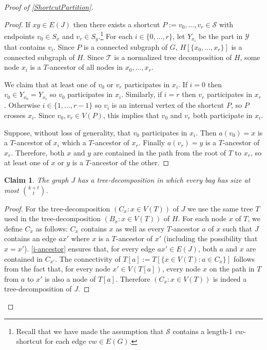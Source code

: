 \documentclass{patmorin}
\theoremstyle{plain}
\newtheorem{clm}{Claim}
\theoremstyle{definition}
\renewcommand{\SS}{\mathcal{S}}
\begin{document}
\begin{proof}[Proof of \cref{ShortcutPartition}]
\begin{proof}
  If $xy\in E(J)$ then there exists a shortcut $P:=v_0,\ldots,v_r\in\SS$ with endpoints $v_0\in S_x$ and $v_r\in S_y$.\footnote{Recall that we have made the assumption that $\SS$ contains a length-$1$ $vw$-shortcut for each edge $vw\in E(G)$.}  For each $i\in\{0,\ldots,r\}$, let $Y_{x_i}$ be the part in $\mathcal{Y}$ that contains $v_i$.  Since $P$ is a connected subgraph of $G$, $H[\{x_0,\ldots,x_r\}]$ is a connected subgraph of $H$.  Since $\mathcal{T}$ is a normalized tree decomposition of $H$, some node $x_i$ is a $T$-ancestor of all nodes in $x_0,\ldots,x_r$.

  We claim that at least one of $v_0$ or $v_r$ participates in $x_i$.  If $i=0$ then $v_0\in Y_{x_0}=Y_{x_i}$ so $v_0$ participates in $x_i$. Similarly, if $i=r$ then $v_r$ participates in $x_r$.  Otherwise $i\in\{1,\ldots,r-1\}$ so $v_i$ is an internal vertex of the shortcut $P$, so $P$ crosses $x_i$.  Since $v_0,v_r\in V(P)$, this implies that $v_0$ and $v_r$ both participate in $x_i$.

  Suppose, without loss of generality, that $v_0$ participates in $x_i$.  Then $a(v_0)=x$ is a $T$-ancestor of $x_i$ which a $T$-ancestor of $x_r$.  Finally $a(v_r)=y$ is a $T$-ancestor of $x_r$.  Therefore, both $x$ and $y$ are contained in the path from the root of $T$ to $x_r$, so at least one of $x$ or $y$ is a $T$-ancestor of the other.
\end{proof}

\begin{clm}
\label{general-bag-size}
The graph $J$ has a tree-decomposition in which every bag has size at most $\binom{k+t}{t}$.
\end{clm}

\begin{proof}
  For the tree-decomposition $(C_x:x\in V(T))$ of $J$ we use the same tree $T$ used in the tree-decomposition $(B_x:x\in V(T))$ of $H$. For each node $x$ of $T$, we define $C_x$ as follows: $C_x$ contains $x$ as well as every $T$-ancestor $a$ of $x$ such that $J$ contains an edge $ax'$ where $x$ is a $T$-ancestor of $x'$ (including the possibility that $x=x'$).
  \cref{i-ancestor} ensures that, for every edge $ax'\in E(J)$, both $a$ and $x$ are contained in $C_{x'}$.  The connectivity of $T[a]:=T[\{x\in V(T):a\in C_x\}]$ follows from the fact that, for every node $x'\in V(T[a])$, every node $x$ on the path in $T$ from $a$ to  $x'$ is also a node of $T[a]$.  Therefore $(C_x:x\in V(T))$ is indeed a tree-decomposition of $J$.


\end{proof}
\end{proof}
\end{document}
